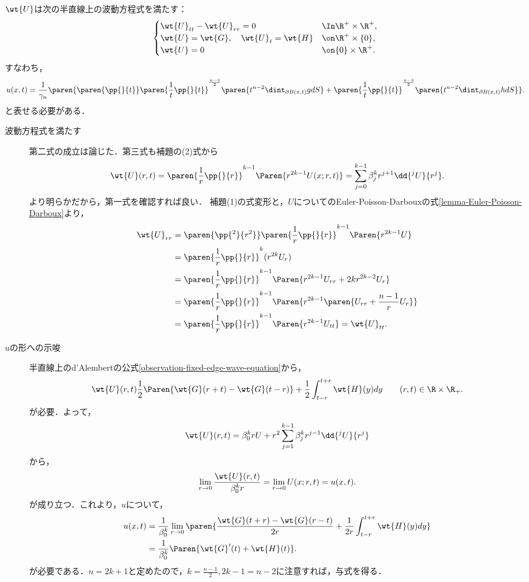 \documentclass[uplatex,dvipdfmx]{jsreport}
\begin{document}
\begin{lemma}
    $\wt{U}$は次の半直線上の波動方程式を満たす：
    \[\begin{cases}
        \wt{U}_{tt}-\wt{U}_{rr}=0&\In\R^+\times\R^+,\\
        \wt{U}=\wt{G},\quad\wt{U}_t=\wt{H}&\on\R^+\times\{0\},\\
        \wt{U}=0&\on\{0\}\times\R^+.
    \end{cases}\]
    すなわち，
    \[u(x,t)=\frac{1}{\gamma_n}\paren{\paren{\pp{}{t}}\paren{\frac{1}{t}\pp{}{t}}^{\frac{n-3}{2}}\paren{t^{n-2}\dint_{\partial B(x,t)}gdS}+\paren{\frac{1}{t}\pp{}{t}}^{\frac{n-3}{2}}\paren{t^{n-2}\dint_{\partial B(x,t)}hdS}}.\]
    と表せる必要がある．
\end{lemma}
\begin{Proof}\mbox{}
    \begin{description}
        \item[波動方程式を満たす] 第二式の成立は論じた．第三式も補題の(2)式から
        \[\wt{U}(r,t)=\paren{\frac{1}{r}\pp{}{r}}^{k-1}\Paren{r^{2k-1}U(x;r,t)}=\sum_{j=0}^{k-1}\beta^k_jr^{j+1}\dd{^jU}{r^j}.\]
        より明らかだから，第一式を確認すれば良い．
        補題(1)の式変形と，$U$についてのEuler-Poisson-Darbouxの式\ref{lemma-Euler-Poisson-Darboux}より，
        \begin{align*}
            \wt{U}_{rr}&=\paren{\pp{^2}{r^2}}\paren{\frac{1}{r}\pp{}{r}}^{k-1}\Paren{r^{2k-1}U}\\
            &=\paren{\frac{1}{r}\pp{}{r}}^k(r^{2k}U_r)\\
            &=\paren{\frac{1}{r}\pp{}{r}}^{k-1}\Paren{r^{2k-1}U_{rr}+2kr^{2k-2}U_r}\\
            &=\paren{\frac{1}{r}\pp{}{r}}^{k-1}\Paren{r^{2k-1}\paren{U_{rr}+\frac{n-1}{r}U_r}}\\
            &=\paren{\frac{1}{r}\pp{}{r}}^{k-1}\Paren{r^{2k-1}U_{tt}}=\wt{U}_{tt}.
        \end{align*}
        \item[$u$の形への示唆] 
        半直線上のd'Alembertの公式\ref{observation-fixed-edge-wave-equation}から，
        \[\wt{U}(r,t)\frac{1}{2}\Paren{\wt{G}(r+t)-\wt{G}(t-r)}+\frac{1}{2}\int^{t+r}_{t-r}\wt{H}(y)dy\qquad(r,t)\in\R\times\R_+.\]
        が必要．よって，
        \[\wt{U}(r,t)=\beta^k_0rU+r^2\sum_{j=1}^{k-1}\beta^k_jr^{j-1}\dd{^jU}{r^j}\]
        から，
        \[\lim_{r\to0}\frac{\wt{U}(r,t)}{\beta^k_0r}=\lim_{r\to0}U(x;r,t)=u(x,t).\]
        が成り立つ．これより，$u$について，
        \begin{align*}
            u(x,t)&=\frac{1}{\beta^k_0}\lim_{r\to0}\paren{\frac{\wt{G}(t+r)-\wt{G}(r-t)}{2r}+\frac{1}{2r}\int^{t+r}_{t-r}\wt{H}(y)dy}\\
            &=\frac{1}{\beta^k_0}\Paren{\wt{G}'(t)+\wt{H}(t)}.
        \end{align*}
        が必要である．$n=2k+1$と定めたので，$k=\frac{n-1}{2},2k-1=n-2$に注意すれば，与式を得る．
    \end{description}
\end{Proof}
\end{document}
